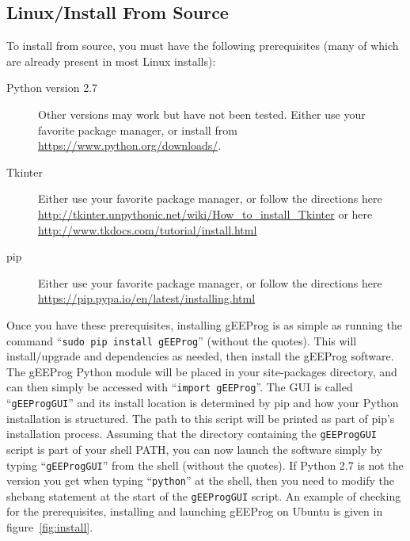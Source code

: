 \documentclass[letter]{article}
\begin{document}
\subsection{Linux/Install From Source}
To install from source, you must have the following prerequisites (many of which are already present in most Linux installs):
\begin{description}
	\item[Python version 2.7] Other versions may work but have not been tested. Either use your favorite package manager, or install from \url{https://www.python.org/downloads/}.
	\item[Tkinter] Either use your favorite package manager, or follow the directions here \url{http://tkinter.unpythonic.net/wiki/How_to_install_Tkinter} or here \url{http://www.tkdocs.com/tutorial/install.html}
	\item[pip] Either use your favorite package manager, or follow the directions here \url{https://pip.pypa.io/en/latest/installing.html}
\end{description}
Once you have these prerequisites, installing gEEProg is as simple as running the command ``\texttt{sudo pip install gEEProg}'' (without the quotes).
This will install/upgrade and dependencies as needed, then install the gEEProg software.
The gEEProg Python module will be placed in your site-packages directory, and can then simply be accessed with ``\texttt{import gEEProg}''.
The GUI is called ``\texttt{gEEProgGUI}'' and its install location is determined by pip and how your Python installation is structured.
The path to this script will be printed as part of pip's installation process.
Assuming that the directory containing the \texttt{gEEProgGUI} script is part of your shell PATH, you can now launch the software simply by typing ``\texttt{gEEProgGUI}'' from the shell (without the quotes).
If Python 2.7 is not the version you get when typing ``\texttt{python}'' at the shell, then you need to modify the shebang statement at the start of the \texttt{gEEProgGUI} script.
An example of checking for the prerequisites, installing and launching gEEProg on Ubuntu is given in figure~\ref{fig:install}.
\end{document}
